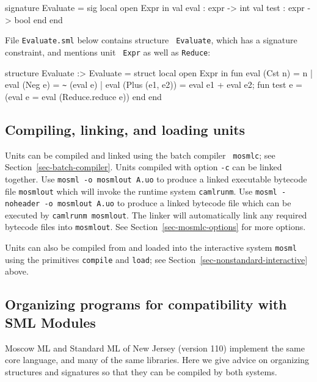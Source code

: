 \documentclass[fleqn]{article}
\begin{document}
\begin{program}
signature Evaluate = sig
    local open Expr 
    in 
        val eval : expr -> int
        val test : expr -> bool
    end
end
\end{program}

\noindent File {\tt Evaluate.sml} below contains structure {\tt
  Evaluate}, which has a signature constraint, and mentions unit {\tt
  Expr} as well as {\tt Reduce}:

\begin{program}
structure Evaluate :> Evaluate = struct 
    local open Expr 
    in 
        fun eval (Cst n)         = n
          | eval (Neg e)         = \verb#~# (eval e)
          | eval (Plus (e1, e2)) = eval e1 + eval e2;
        fun test e = (eval e = eval (Reduce.reduce e))
    end
end
\end{program}


\subsection{Compiling, linking, and loading units}

Units can be compiled and linked using the batch compiler {\tt
  mosmlc}; see Section~\ref{sec-batch-compiler}.  Units compiled with
option {\tt -c} can be linked together.  Use {\tt mosml -o mosmlout
  A.uo} to produce a linked executable bytecode file {\tt mosmlout}
which will invoke the runtime system {\tt camlrunm}.  Use {\tt mosml
  -noheader -o mosmlout A.uo} to produce a linked bytecode file which
can be executed by {\tt camlrunm mosmlout}.  The linker will
automatically link any required bytecode files into {\tt mosmlout}.
See Section~\ref{sec-mosmlc-options} for more options.

Units can also be compiled from and loaded into the interactive system
{\tt mosml} using the primitives {\tt compile} and {\tt load}; see
Section~\ref{sec-nonstandard-interactive} above.


\subsection{Organizing  programs for compatibility with SML Modules}
\label{sec-compatible-modules}

Moscow ML and Standard ML of New Jersey (version 110) implement the
same core language, and many of the same libraries.  Here we give
advice on organizing structures and signatures so that they can be
compiled by both systems.
\end{document}
